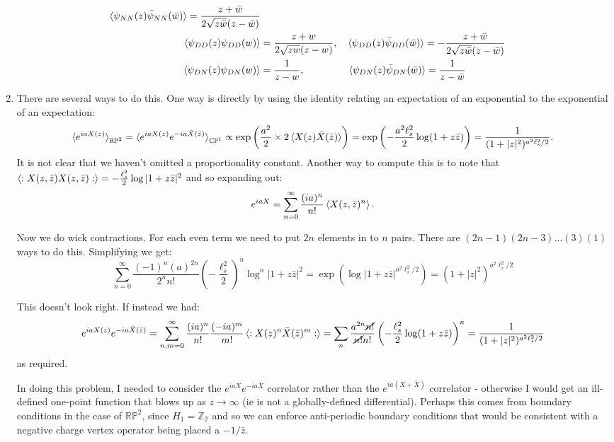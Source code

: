 \documentclass[11pt]{article}
\begin{document}
\begin{enumerate}
\[\begin{aligned}
		\braket{\psi_{NN}(z) \bar \psi_{NN} (\bar w)} = \frac{z+\bar w}{2 \sqrt{z \bar w} (z - \bar w)} \\
		\braket{\psi_{DD}(z) \psi_{DD} (w)} &= \frac{z+w}{2 \sqrt{z w} (z - w)}, \quad 
		\braket{\psi_{DD}(z) \bar \psi_{DD} (\bar w)} = -\frac{z+\bar w}{2 \sqrt{z \bar w} (z - \bar w)} \\
		\braket{\psi_{DN}(z) \psi_{DN} (w)} &= \frac{1}{z-w}, \;\, \qquad \qquad 
		\braket{\psi_{DN}(z) \bar \psi_{DN} (\bar w)} = \frac{1}{z-\bar w}\\
	\end{aligned}
	\]
	\item There are several ways to do this. One way is directly by using the identity relating an expectation of an exponential to the exponential of an expectation:
	\[
		\braket{e^{i a X(z)}}_{\mathbb{RP}^2} = \braket{e^{i a X(z) } e^{-i a \bar X(\bar z)}}_{\mathbb{CP}^1} \propto \exp\left(\frac{a^2}{2} \times 2 \braket{X(z) \bar X(\bar z)}\right) = \exp\left(-\frac{a^2 \ell_s^2}{2} \log(1 + z \bar z)\right) = \frac{1}{(1+|z|^2)^{a^2 \ell_s^2/2}}.
	\]
	It is not clear that we haven't omitted a proportionality constant. Another way to compute this is to note that $\braket{:X(z, \bar z) X(z, \bar z):} = - \frac{\ell_s^2}{2} \log|1 + z \bar z|^2$ and so expanding out:
	\[
		e^{i a X} = \sum_{n=0}^\infty \frac{(ia)^n}{n!} \braket{X(z, \bar z)^n}.
	\]
	
	Now we do wick contractions. For each even term we need to put $2n$ elements in to $n$ pairs. There are $(2n-1)(2n-3) \dots (3) (1)$ ways to do this. Simplifying we get:
	\[
		\sum_{n=0}^\infty \frac{(-1)^n (a)^{2n}}{2^n n!} \left(-\frac{\ell_s^2}{2}\right)^{n} \log^n |1+z \bar z|^2 = \exp\left(\log|1+z \bar z|^{a^2 \ell_s^2/2} \right) = (1 + |z|^2)^{a^2 \ell_s^2/2}
	\]
	
	This doesn't look right. If instead we had:
	\[
		e^{i a X(z)} e^{-i a \bar X(\bar z)} = \sum_{n,m=0}^\infty \frac{(i a)^n}{n!}  \frac{(-i a)^m}{m!} \braket{:X(z)^n \bar X(\bar z)^m:} = \sum_n \frac{a^{2n} \cancel{n!}}{\cancel{n!} n!} \left(-\frac{\ell_s^2}{2} \log(1 + z \bar z) \right)^n = \frac{1}{(1 + |z|^2)^{a^2 \ell_s^2/2}}
	\]
	as required. 
	
	In doing this problem, I needed to consider the $e^{i a X} e^{-i a \bar X}$ correlator rather than the $e^{i a (X + \bar X)}$ correlator - otherwise I would get an ill-defined one-point function that blows up as $z \to \infty$ (ie is not a globally-defined differential). Perhaps this comes from boundary conditions in the case of $\mathbb{RP}^2$, since $H_1 = \mathbb{Z_2}$ and so we can enforce anti-periodic boundary conditions that would be consistent with a negative charge vertex operator being placed a $-1/\bar z$. 
	

\end{enumerate}
\end{document}
